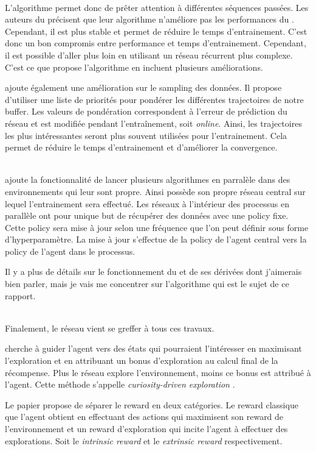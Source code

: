 ~\\
L'algorithme  permet donc de prêter attention à différentes séquences passées. Les auteurs du  précisent que leur algorithme n'améliore pas les performances du . Cependant, il est plus stable et permet de réduire le temps d'entrainement. C'est donc un bon compromis entre performance et temps d'entrainement. Cependant, il est possible d'aller plus loin en utilisant un réseau récurrent plus complexe. C'est ce que propose l'algorithme  en incluent plusieurs améliorations.

 ajoute également une amélioration sur le sampling des données. Il propose d'utiliser une liste de priorités pour pondérer les différentes trajectoires de notre buffer. Les valeurs de pondération correspondent à l'erreur de prédiction du réseau et est modifiée pendant l'entraînement, soit \textit{online}. Ainsi, les trajectoires les plus intéressantes seront plus souvent utilisées pour l'entrainement. Cela permet de réduire le temps d'entrainement et d'améliorer la convergence.

~\\
 ajoute la fonctionnalité de lancer plusieurs algorithmes  en parralèle dans des environnements qui leur sont propre. Ainsi  possède son propre réseau central  sur lequel l'entrainement sera effectué. Les réseaux à l'intérieur des processus en parallèle ont pour unique but de récupérer des données avec une policy fixe. Cette policy sera mise à jour selon une fréquence que l'on peut définir sous forme d'hyperparamètre. La mise à jour s'effectue de la policy de l'agent central vers la policy de l'agent dans le processus.

Il y a plus de détails sur le fonctionnement du  et de ses dérivées dont j'aimerais bien parler, mais je vais me concentrer sur l'algorithme  qui est le sujet de ce rapport.

~\\
Finalement, le réseau  vient se greffer à tous ces travaux.

 cherche à guider l'agent vers des états qui pourraient l'intéresser en maximisant l'exploration et en attribuant un bonus d'exploration au calcul final de la récompense. Plus le réseau explore l'environnement, moins ce bonus est attribué à l'agent. Cette méthode s'appelle \textit{curiosity-driven exploration} \cite{ICM}.

Le papier propose de séparer le reward en deux catégories. Le reward classique que l'agent obtient en effectuant des actions qui maximisent son reward de l'environnement et un reward d'exploration qui incite l'agent à effectuer des explorations. Soit le \textit{intrinsic reward} et le \textit{extrinsic reward} respectivement.


